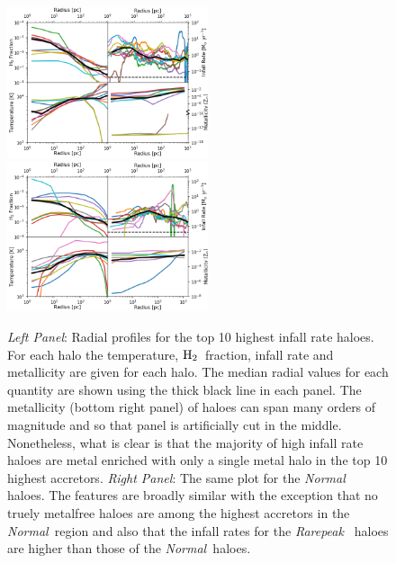 \documentclass[graphics, twocolumn, usenatbib]{mn2e}
\newcommand{\molH} {$\rm{H_2}$~}
\newcommand{\rarepeak} {\textit{Rarepeak~}}
\newcommand{\normal} {\textit{Normal~}}
\begin{document}
\begin{figure}
\centering
\begin{minipage}{175mm}      \begin{center} 
\centerline{
\includegraphics[width=0.525\textwidth]{FIGURES/MultiPlot_Rarepeak.png}
\includegraphics[width=0.525\textwidth]{FIGURES/MultiPlot_Normal.png}}
\caption{\textit{Left Panel}: Radial profiles for the top 10 highest infall rate haloes. For
  each halo the temperature, \molH fraction, infall rate and metallicity are given for
  each halo. The median radial values for each quantity are shown using the
  thick black line in each panel. The metallicity (bottom right panel) of haloes can span many
  orders of magnitude and so that panel is artificially cut in the middle. Nonetheless, what is
  clear is that the majority of high infall rate haloes are metal enriched with only a single
  metal halo in the top 10 highest accretors. \textit{Right Panel}: The same plot for the \normal
  haloes. The features are broadly similar with the exception that no truely metalfree haloes are
  among the highest accretors in the \normal region and also that the infall rates for the \rarepeak
  haloes are higher than those of the \normal haloes. 
} \label{Fig:RadialProfiles}
\end{center} \end{minipage}

\end{figure}
\end{document}
